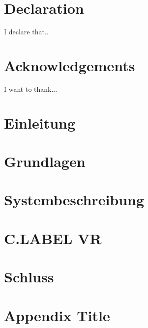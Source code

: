 \documentclass[12pt]{scrreprt}
\begin{document}

\chapter*{Declaration}
I declare that..

\chapter*{Acknowledgements}
I want to thank...
\newpage

\newpage
\printnoidxglossary[style=altlist,title=Glossar]

\newpage
{}
\printnoidxglossary[type=\acronymtype,style=long]

\newpage
\printnoidxglossary[type=symbolslist,style=long]


\chapter{Einleitung}


\chapter{Grundlagen}


\chapter{Systembeschreibung}


\chapter{C.LABEL VR}


\chapter{Schluss}




%


\appendix
\chapter{Appendix Title}
%





\end{document}
